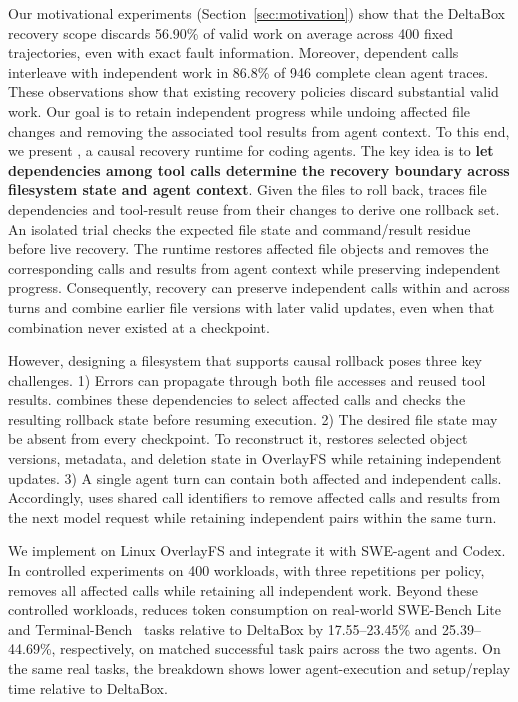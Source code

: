 Our motivational experiments (Section~\ref{sec:motivation}) show that
the DeltaBox recovery scope discards 56.90\% of valid work on average across 400
fixed trajectories, even with exact fault information. Moreover, dependent
calls interleave with independent work in 86.8\% of 946 complete clean agent
traces. These observations show that existing recovery policies discard
substantial valid work. Our goal is to retain independent progress while
undoing affected file changes and removing the associated tool results
from agent context.
To this end, we present \system, a causal recovery runtime for coding
agents. The key idea is to \textbf{let dependencies among tool calls
determine the recovery boundary across filesystem state and agent context}.
Given the files to roll back, \system traces file dependencies and
tool-result reuse from their changes to derive one rollback set.
An isolated trial checks the expected file state and command/result residue
before live recovery. The runtime restores affected file objects and
removes the corresponding calls and results from agent context while preserving
independent progress. Consequently, recovery can preserve independent calls
within and across turns and combine earlier file versions with later valid
updates, even when that combination never existed at a checkpoint.

However, designing a filesystem that supports causal rollback poses three
key challenges.
1) Errors can propagate through both file accesses and reused tool results.
\system combines these dependencies to select affected calls and checks
the resulting rollback state before resuming execution.
2) The desired file state may be absent from every checkpoint. To
reconstruct it, \system restores selected object versions, metadata, and
deletion state in OverlayFS while retaining independent updates.
3) A single agent turn can contain both affected and independent calls.
Accordingly, \system uses shared call identifiers to remove affected
calls and results from the next model request while retaining independent
pairs within the same turn.

We implement \system on Linux OverlayFS and integrate it with SWE-agent
and Codex. In controlled
experiments on 400 workloads, with three
repetitions per policy, \system removes all affected calls while retaining
all independent work. Beyond these controlled workloads, \system reduces token consumption
on real-world SWE-Bench Lite~\cite{swebench} and Terminal-Bench~\cite{tbench}
tasks relative to DeltaBox by 17.55--23.45\% and 25.39--44.69\%,
respectively, on matched successful task pairs across the two agents.
On the same real tasks, the breakdown shows lower agent-execution and
setup/replay time relative to DeltaBox.

